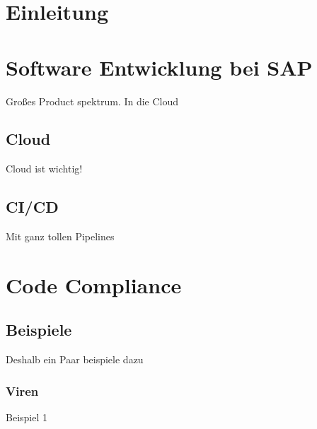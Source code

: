 \documentclass[
	12pt, %
	a4paper,
	liststotoc, %
	bibtotoc, %
	pointlessnumbers, %
	ngerman, %
	headsepline, %
	oneside %
	]{scrbook} %
\begin{document}

\newpage

\tableofcontents{}

\listoffigures
\listoftables


\printnoidxglossaries

\clearpage



\chapter{Einleitung}\label{ch:einleitung}


\chapter{Software Entwicklung bei SAP}\label{ch:sap_software_entwicklung}

Großes Product spektrum. In die Cloud

\section{Cloud}\label{sec:cloud}

Cloud ist wichtig!

\section{CI/CD}\label{sec:cicd}

Mit ganz tollen Pipelines

\chapter{Code Compliance}\label{ch:code_compliance}

\section{Beispiele}\label{sec:compliance_beispiele}

Deshalb ein Paar beispiele dazu

\subsection{Viren}\label{subsec:viren_beispiel}
Beispiel 1
\end{document}
